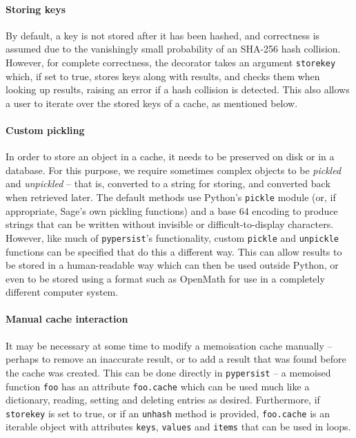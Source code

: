 \documentclass{deliverablereport}
\newcommand{\pypersist}{\texttt{pypersist}}
\begin{document}
\paragraph{Storing keys}
By default, a key is not stored after it has been hashed, and correctness is
assumed due to the vanishingly small probability of an SHA-256 hash collision.
However, for complete correctness, the decorator takes an argument
\texttt{storekey} which, if set to true, stores keys along with results, and
checks them when looking up results, raising an error if a hash collision is
detected.  This also allows a user to iterate over the stored keys of a cache,
as mentioned below.

\paragraph{Custom pickling}
In order to store an object in a cache, it needs to be preserved on disk or in a
database.  For this purpose, we require sometimes complex objects to be
\textit{pickled} and \textit{unpickled} -- that is, converted to a string for
storing, and converted back when retrieved later.  The default methods use
Python's \texttt{pickle} module (or, if appropriate, Sage's own pickling
functions) and a base 64 encoding to produce strings that
can be written without invisible or difficult-to-display characters.  However,
like much of \texttt{pypersist}'s functionality, custom \texttt{pickle} and
\texttt{unpickle} functions can be specified that do this a different way.  This
can allow results to be stored in a human-readable way which can then be used
outside Python, or even to be stored using a format such as OpenMath for use in
a completely different computer system.

\paragraph{Manual cache interaction}
It may be necessary at some time to modify a memoisation cache manually --
perhaps to remove an inaccurate result, or to add a result that was found before
the cache was created.  This can be done directly in \pypersist{} -- a memoised
function \texttt{foo} has an attribute \texttt{foo.cache} which can be used much
like a dictionary, reading, setting and deleting entries as desired.
Furthermore, if \texttt{storekey} is set to true, or if an \texttt{unhash}
method is provided, \texttt{foo.cache} is an iterable object with attributes
\texttt{keys}, \texttt{values} and \texttt{items} that can be used in loops.
\end{document}
